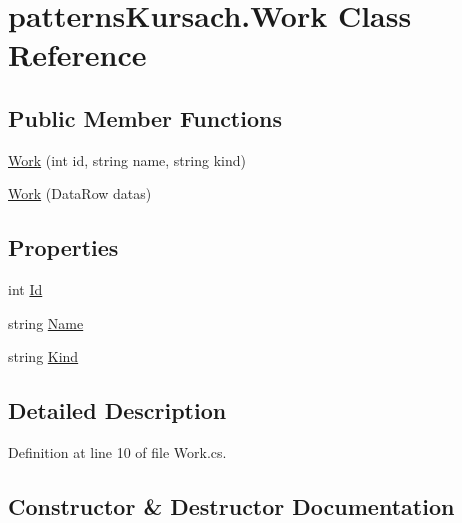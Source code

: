 \hypertarget{classpatterns_kursach_1_1_work}{}\section{patterns\+Kursach.\+Work Class Reference}
\label{classpatterns_kursach_1_1_work}
\subsection*{Public Member Functions}
\begin{DoxyCompactItemize}
\item 
\mbox{\hyperlink{classpatterns_kursach_1_1_work_a048e29adb18238c639ad66f68e016c49}{Work}} (int id, string name, string kind)
\item 
\mbox{\hyperlink{classpatterns_kursach_1_1_work_a8a6f1bcd6608b89d8a7e33b170492fc3}{Work}} (Data\+Row datas)
\end{DoxyCompactItemize}
\subsection*{Properties}
\begin{DoxyCompactItemize}
\item 
int \mbox{\hyperlink{classpatterns_kursach_1_1_work_a2ef9dc5b4453ca418818c10ddc609186}{Id}}
\item 
string \mbox{\hyperlink{classpatterns_kursach_1_1_work_af3706083bb585a0cf3b6a69cddf9c45f}{Name}}
\item 
string \mbox{\hyperlink{classpatterns_kursach_1_1_work_a40621d3042128256f9d180095fba721a}{Kind}}
\end{DoxyCompactItemize}


\subsection{Detailed Description}


Definition at line 10 of file Work.\+cs.



\subsection{Constructor \& Destructor Documentation}
\mbox{\label{classpatterns_kursach_1_1_work_a048e29adb18238c639ad66f68e016c49}} 
